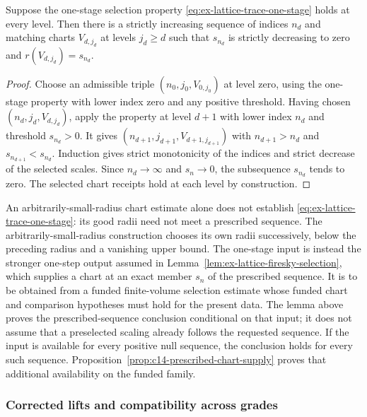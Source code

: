 \begin{lemma}
\label{lem:ex-lattice-trace-strict-subsequence}
Suppose the one-stage selection property
\eqref{eq:ex-lattice-trace-one-stage} holds at every level. Then there is a
strictly increasing sequence of indices $n_d$ and matching charts $V_{d,j_d}$
at levels $j_d\ge d$ such that $s_{n_d}$ is strictly decreasing to zero and
$r(V_{d,j_d})=s_{n_d}$.
\end{lemma}
\begin{proof}
Choose an admissible triple $(n_0,j_0,V_{0,j_0})$ at level zero, using the
one-stage property with lower index zero and any positive
threshold. Having chosen $(n_d,j_d,V_{d,j_d})$, apply the property at level
$d+1$ with
lower index $n_d$ and threshold $s_{n_d}>0$. It gives
$(n_{d+1},j_{d+1},V_{d+1,j_{d+1}})$
with $n_{d+1}>n_d$ and $s_{n_{d+1}}<s_{n_d}$. Induction gives strict
monotonicity of the indices and strict decrease of the selected scales.
Since $n_d\to\infty$ and $s_n\to0$, the subsequence $s_{n_d}$ tends to
zero. The selected chart receipts hold at each level by construction.
\end{proof}

An arbitrarily-small-radius chart estimate alone does not establish
\eqref{eq:ex-lattice-trace-one-stage}: its good radii need not meet a
prescribed sequence. The arbitrarily-small-radius construction chooses
its own radii successively, below the preceding radius and a vanishing
upper bound. The one-stage input is instead the stronger one-step output
assumed in Lemma~\ref{lem:ex-lattice-firesky-selection}, which supplies a
chart at an exact member $s_n$ of the prescribed sequence. It is to be
obtained from a funded finite-volume selection estimate whose funded chart
and comparison hypotheses must hold for the present data. The lemma above
proves the prescribed-sequence conclusion conditional on that input; it
does not assume that a preselected scaling already follows the requested
sequence. If the input is available for every positive null sequence, the
conclusion holds for every such sequence. Proposition~\ref{prop:c14-prescribed-chart-supply}
proves that additional availability on the funded family.

\subsubsection{Corrected lifts and compatibility across grades}
\label{subsec:ex-trace-corrected-lifts}


